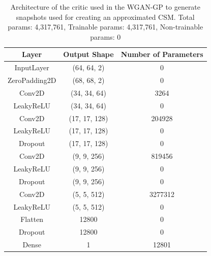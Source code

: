 \documentclass[11pt,a4paper,twoside]{report}
\begin{document}
\begin{table}[]
  \centering
  \begin{tabular}{c c c}
      \hline
      \textbf{Layer} & \textbf{Output Shape} & \textbf{Number of Parameters} \\ \hline
      InputLayer            & (64, 64, 2)   & 0                 \\
      ZeroPadding2D         & (68, 68, 2)   & 0                 \\
      Conv2D                & (34, 34, 64)  & 3264              \\
      LeakyReLU             & (34, 34, 64)  & 0                 \\
      Conv2D                & (17, 17, 128) & 204928            \\
      LeakyReLU             & (17, 17, 128) & 0                 \\
      Dropout               & (17, 17, 128) & 0                 \\
      Conv2D                & (9, 9, 256)   & 819456            \\
      LeakyReLU             & (9, 9, 256)   & 0                 \\
      Dropout               & (9, 9, 256)   & 0                 \\
      Conv2D                & (5, 5, 512)   & 3277312           \\
      LeakyReLU             & (5, 5, 512)   & 0                 \\
      Flatten               & 12800         & 0                 \\
      Dropout               & 12800         & 0                 \\
      Dense                 & 1             & 12801             \\
      \end{tabular}
  \caption{Architecture of the critic used in the WGAN-GP to generate snapshots used for creating an approximated CSM. Total params: 4,317,761, Trainable params: 4,317,761, Non-trainable params: 0}
  \label{tab:snapshots_critic_WGANGP_architecture}
\end{table}






\cleardoublepage

\fancyhead[LO]{\scshape\bibname}
\fancyhead[RO]{}
\fancyhead[LE]{}
\fancyhead[RE]{\scshape\bibname}
\end{document}
